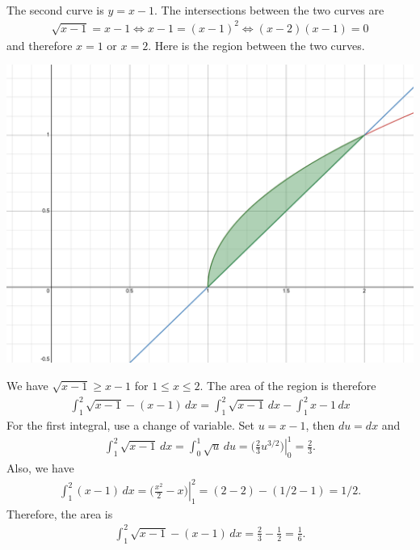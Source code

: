 	\newpage
	
	\\
	The second curve is $y = x - 1$. The intersections between the two curves are
		\begin{align*}
		\sqrt{x - 1} = x - 1 \iff x - 1 = (x - 1)^2 \iff (x-2)(x-1) = 0
		\end{align*}
	and therefore $x = 1$ or $x = 2$. Here is the region between the two curves.
		\begin{center}
		\includegraphics[scale=0.3]{fig2.png}
		\end{center}
		
	We have $\sqrt{x - 1} \geq x - 1$ for $1 \leq x \leq 2$. The area of the region is therefore
		\begin{align*}
		\int_1^2 \sqrt{x - 1} - (x - 1) \, dx = \int_1^2 \sqrt{x-1} \, dx - \int_1^2 x - 1 \, dx
		\end{align*}
	For the first integral, use a change of variable. Set $u = x - 1$, then $du = dx$ and
		\begin{align*}
		\int_1^2 \sqrt{x-1} \, dx = \int_0^1 \sqrt{u} \, du = \left. \big( \frac{2}{3} u^{3/2} \big)\right|_0^1 = \frac{2}{3} .
		\end{align*}
	Also, we have
		\begin{align*}
		\int_1^2 (x - 1) \, dx = \left. \big( \frac{x^2}{2} - x \big) \right|_1^2 = (2 - 2) - (1/2 - 1) = 1/2 .
		\end{align*}
	Therefore, the area is
		\begin{align*}
		\int_1^2 \sqrt{x - 1} - (x - 1) \, dx = \frac{2}{3} - \frac{1}{2} = \frac{1}{6} .
		\end{align*}
	
	
